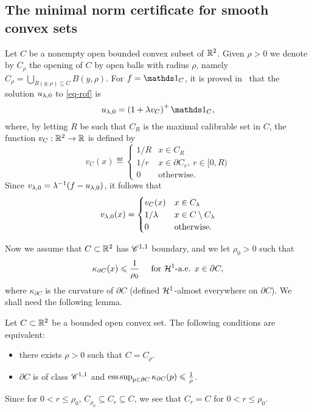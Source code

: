 \subsection{The minimal norm certificate for smooth convex sets}\label{sec:MNC_convex}
Let $C$ be a nonempty open bounded convex subset of $\mathbb{R}^2$. Given $\rho>0$ we denote by $C_\rho$ the opening of $C$ by open balls with radius $\rho$, namely $C_\rho=\bigcup_{B(y,\rho)\subseteq C} B(y,\rho)$.
 For $f=\bun{C}$, it is proved in~\cite{altercalib05,alterconvex05,Chambolle10anintroduction} that the solution $u_{\lambda,0}$ to \eqref{eq-rof} is 
$$
\ulao = \left(1+ \la v_C \right)^+ \bun{C},
$$
where, by letting $R$ be such that $C_R$ is the maximal calibrable set in $C$, the function $v_C:\mathbb{R}^2\to \mathbb{R}$ is defined by
\begin{equation}\label{eq:convexvc}
v_C(x) \eqdef \begin{cases}
1/R & x\in C_{R}\\
1/r & x\in \partial C_r, ~ r\in [0,R) \\
0 & \text{otherwise.}
\end{cases}
\end{equation}
Since $v_{\lambda,0} = \lambda^{-1}(f- u_{\lambda,0})$, it follows that
\begin{equation}\label{eq:convexcertif}
v_{\lambda,0}(x) = \begin{cases}
v_C(x) & x\in C_\lambda \\
1/\lambda & x\in C\setminus C_\lambda\\
0& \text{otherwise.}
\end{cases}
\end{equation}

Now we assume that $C\subset \mathbb{R}^2$ has $\mathscr{C}^{1,1}$ boundary, and we let $\rho_0>0$ such that
\begin{align*}
  \kappa_{\partial C}(x)\leqslant \frac{1}{\rho_0} \quad \mbox{ for } \mathcal{H}^1\mbox{-a.e. }x\in \partial C,
\end{align*}
where $\kappa_{\partial C}$ is the curvature of $\partial C$ (defined $\mathcal{H}^1$-almost everywhere on $\partial C$).
We shall need the following lemma.
\begin{lem}
  Let $C\subset \mathbb{R}^2$ be a bounded open convex set. The following conditions are equivalent:
\begin{itemize}
  \item there exists $\rho >0$ such that $C=C_\rho$.
  \item $\partial C$ is of class $\mathscr{C}^{1,1}$ and $\operatorname{ess} \sup_{p\in \partial C}\kappa_{\partial C}(p) \leqslant \frac{1}{\rho}$.
\end{itemize}
\end{lem}
Since for $0<r\leq \rho_0$, $C_{\rho_0}\subseteq C_r\subseteq C$, we see that  $C_r=C$ for $0<r\leq \rho_0$.


